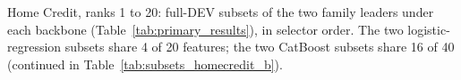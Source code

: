 \documentclass[final,5p,twocolumn]{elsarticle}
\providecommand{\DIFdeltex}[1]{{\protect\color{red} \scriptsize #1}} %
\providecommand{\DIFdelbegin}{} %
\providecommand{\DIFdelFL}[1]{\DIFdel{#1}} %
\providecommand{\DIFdel}[1]{\texorpdfstring{\DIFdeltex{#1}}{}} %
\begin{document}
\DIFdelbegin %
{%
\DIFdelFL{Home Credit, ranks 1 to 20: full-DEV subsets of the two family leaders under each backbone (Table~\ref{tab:primary_results}), in selector order. The two logistic-regression subsets share 4 of 20 features; the two CatBoost subsets share 16 of 40 (continued in Table~\ref{tab:subsets_homecredit_b}).}}
\end{document}
